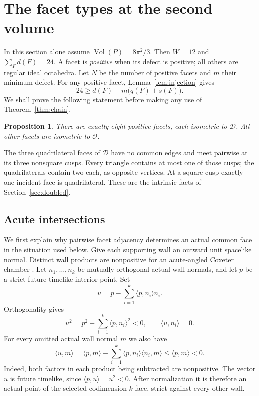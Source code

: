 \documentclass[11pt]{article}
\newtheorem{proposition}[theorem]{Proposition}
\theoremstyle{remark}
\newcommand{\Vol}{\operatorname{Vol}}
\newcommand{\ip}[2]{\langle #1,#2\rangle}
\newcommand{\OCT}{\mathcal O}
\newcommand{\DBL}{\mathcal D}
\begin{document}
\section{The facet types at the second volume}\label{sec:equalityspectrum}
In this section alone assume $\Vol(P)=8\pi^2/3$. Then $W=12$ and
$\sum_Fd(F)=24$. A facet is \emph{positive} when its defect is
positive; all others are regular ideal octahedra. Let $N$ be the
number of positive facets and $m$ their minimum defect. For any
positive facet, Lemma~\ref{lem:injection} gives
\begin{equation}\label{eq:equalitybudget}
 24\ge d(F)+m\bigl(q(F)+s(F)\bigr).
\end{equation}
We shall prove the following statement before making any use of
Theorem~\ref{thm:chain}.
\begin{proposition}\label{prop:equalityspectrum}
There are exactly eight positive facets, each isometric to $\DBL$.
All other facets are isometric to $\OCT$.
\end{proposition}
The three quadrilateral faces of $\DBL$ have no common edges and
meet pairwise at its three nonsquare cusps. Every triangle contains
at most one of those cusps; the quadrilaterals contain two each,
as opposite vertices. At a square cusp exactly one incident face
is quadrilateral. These are the intrinsic facts of
Section~\ref{sec:doubled}.

\subsection{Acute intersections}

We first explain why pairwise facet adjacency determines an actual
common face in the situation used below. Give each supporting wall
an outward unit spacelike normal. Distinct wall products are
nonpositive for an acute-angled Coxeter chamber
\cite[p.~42, \S2.1]{Vinberg}. Let $n_1,\dots,n_k$ be mutually
orthogonal actual wall normals, and let $p$ be a strict future
timelike interior point. Set
\[
 u=p-\sum_{i=1}^k\ip{p}{n_i}n_i.
\]
Orthogonality gives
\[
 u^2=p^2-\sum_{i=1}^k\ip{p}{n_i}^2<0,
 \qquad \ip{u}{n_i}=0.
\]
For every omitted actual wall normal $m$ we also have
\[
 \ip{u}{m}
 =\ip{p}{m}-\sum_{i=1}^k\ip{p}{n_i}\ip{n_i}{m}
 \le\ip{p}{m}<0.
\]
Indeed, both factors in each product being subtracted are
nonpositive. The vector $u$ is future timelike, since
$\ip{p}{u}=u^2<0$. After normalization it is therefore an actual
point of the selected codimension-$k$ face, strict against every
other wall.
\end{document}
